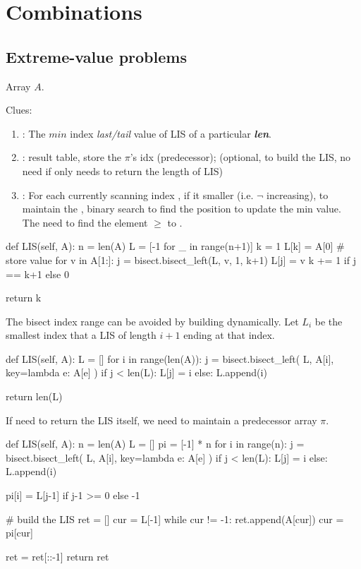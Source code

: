 \section{Combinations}
\subsection{Extreme-value problems}\label{extremeValueProblem}
 Array $A$.

Clues:
\begin{enumerate}
\item {}: The $min$ index \textit{last/tail} value of LIS of a particular \textit{\textbf{len}}.
\item {}: result table, store the $\pi$'s idx (predecessor); (optional, to build the LIS, no need if only needs to return the length of LIS)
\item {}: For each currently scanning index , if it smaller (i.e. $\neg$ increasing), to maintain the , binary search to find the position to update the min value. The  need to find the element $\geq$ to .
\end{enumerate}
\begin{python}
def LIS(self, A):
    n = len(A)
    L = [-1 for _ in range(n+1)]
    k = 1
    L[k] = A[0]  # store value
    for v in A[1:]:
        j = bisect.bisect_left(L, v, 1, k+1)
        L[j] = v
        k += 1 if j == k+1 else 0

    return k
\end{python}
The bisect index range can be avoided by building  dynamically. Let $L_i$ be the smallest index that a LIS of length $i+1$ ending at that index.
\begin{python}
def LIS(self, A):
    L = []
    for i in range(len(A)):
        j = bisect.bisect_left(
            L, A[i], key=lambda e: A[e]
        )
        if j < len(L):
            L[j] = i
        else:
            L.append(i)

    return len(L)
\end{python}

If need to return the LIS itself, we need to maintain a predecessor array $\pi$.
\begin{python}
def LIS(self, A):
    n = len(A)
    L = []
    pi = [-1] * n
    for i in range(n):
        j = bisect.bisect_left(
            L, A[i], key=lambda e: A[e]
        )
        if j < len(L):
            L[j] = i
        else:
            L.append(i)
        
        pi[i] = L[j-1] if j-1 >= 0 else -1

    # build the LIS
    ret = []
    cur = L[-1]
    while cur != -1:
        ret.append(A[cur])
        cur = pi[cur]

    ret = ret[::-1]
    return ret
\end{python}

